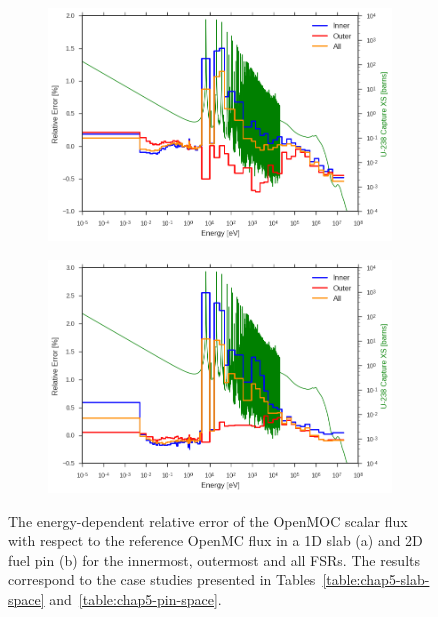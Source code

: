 \begin{figure}[h!]
\begin{subfigure}{.9\textwidth}
  \centering
  \includegraphics[width=\linewidth]{figures/biases/slab/rel-err-inner-outer}
  \caption{}
\end{subfigure}
\begin{subfigure}{.9\textwidth}
  \centering
  \includegraphics[width=\linewidth]{figures/biases/pin-cell/rel-err-inner-outer}
  \caption{}
\end{subfigure}
\caption[Flux relative error by energy group]{The energy-dependent relative error of the OpenMOC scalar flux with respect to the reference OpenMC flux in a 1D slab (a) and 2D fuel pin (b) for the innermost, outermost and all \ac{FSR}s. The results correspond to the case studies presented in Tables~\ref{table:chap5-slab-space} and~\ref{table:chap5-pin-space}.}
\label{fig:chap5-rel-err-energy}
\end{figure}

